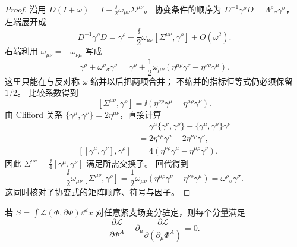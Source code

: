 \begin{proof}
沿用 $D(I+\omega)=I-\frac{\ii}{2}\omega_{\mu\nu}\Sigma^{\mu\nu}$。
协变条件的顺序为 $D^{-1}\gamma^\rho D=\Lambda^\rho{}_\sigma\gamma^\sigma$，
左端展开成
\[
D^{-1}\gamma^\rho D
=\gamma^\rho+\frac{\ii}{2}\omega_{\mu\nu}
[\Sigma^{\mu\nu},\gamma^\rho]+O(\omega^2).
\]
右端利用 $\omega_{\mu\nu}=-\omega_{\nu\mu}$ 写成
\[
\gamma^\rho+\omega^\rho{}_\sigma\gamma^\sigma
=\gamma^\rho+\frac12\omega_{\mu\nu}
(\eta^{\mu\rho}\gamma^\nu-\eta^{\nu\rho}\gamma^\mu).
\]
这里只能在与反对称 $\omega$ 缩并以后把两项合并；
不缩并的指标恒等式仍必须保留 $1/2$。
比较系数得到
\begin{equation}\label{eq:ms-poincare-sigma-gamma-comm}
[\Sigma^{\mu\nu},\gamma^\rho]
=\ii(\eta^{\nu\rho}\gamma^\mu-\eta^{\mu\rho}\gamma^\nu).
\end{equation}
由 Clifford 关系 $\{\gamma^\mu,\gamma^\nu\}=2\eta^{\mu\nu}$，直接计算
\begin{align*}
[\gamma^\mu\gamma^\nu,\gamma^\rho]
&=\gamma^\mu\{\gamma^\nu,\gamma^\rho\}
-\{\gamma^\mu,\gamma^\rho\}\gamma^\nu\\
&=2\eta^{\nu\rho}\gamma^\mu-2\eta^{\mu\rho}\gamma^\nu,\\
[[\gamma^\mu,\gamma^\nu],\gamma^\rho]
&=4(\eta^{\nu\rho}\gamma^\mu-\eta^{\mu\rho}\gamma^\nu).
\end{align*}
因此 $\Sigma^{\mu\nu}=\frac{\ii}{4}[\gamma^\mu,\gamma^\nu]$ 满足所需交换子。
回代得到
\[
\frac{\ii}{2}\omega_{\mu\nu}[\Sigma^{\mu\nu},\gamma^\rho]
=\frac12\omega_{\mu\nu}
(\eta^{\mu\rho}\gamma^\nu-\eta^{\nu\rho}\gamma^\mu)
=\omega^\rho{}_\sigma\gamma^\sigma.
\]
这同时核对了协变式的矩阵顺序、符号与因子。
\end{proof}

\begin{proposition}
若 $S=\int\mathcal L(\Phi,\partial\Phi)\dd^dx$ 对任意紧支场变分驻定，则每个分量满足\[\frac{\partial\mathcal L}{\partial\Phi^A}-\partial_\mu\frac{\partial\mathcal L}{\partial(\partial_\mu\Phi^A)}=0.\]
\end{proposition}

